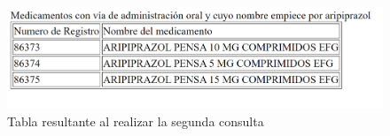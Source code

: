 \documentclass[../main.tex]{subfiles}
\begin{document}
\begin{figure}[h]
    \centering
    \includegraphics[scale=0.3]{images/xquery_3_output.png}
    \caption{Tabla resultante al realizar la segunda consulta}
    \label{fig:mesh1}
\end{figure}
\end{document}
